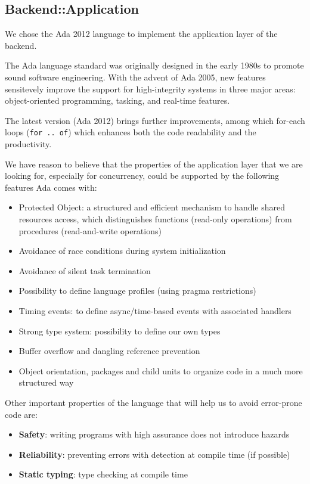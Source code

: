 \subsection{Backend::Application}
We chose the Ada 2012 language to implement the application layer of the
backend.

The Ada language standard was originally designed in the early 1980s to promote
sound software engineering. With the advent of Ada 2005, new features
sensitevely improve the support for high-integrity systems in three major
areas: object-oriented programming, tasking, and real-time features.

The latest version (Ada 2012) brings further improvements, among which for-each
loops (\texttt{for .. of}) which enhances both the code readability and the
productivity.

We have reason to believe that the properties of the application layer
that we are looking for, especially for concurrency, could be supported by the
following features Ada comes with:
\begin{itemize}
  \item Protected Object: a structured and efficient mechanism to handle
        shared resources access, which distinguishes functions (read-only
        operations) from procedures (read-and-write operations)
  \item Avoidance of race conditions during system initialization
  \item Avoidance of silent task termination
  \item Possibility to define language profiles (using pragma restrictions)
  \item Timing events: to define async/time-based events with associated
        handlers
  \item Strong type system: possibility to define our own types
  \item Buffer overflow and dangling reference prevention
  \item Object orientation, packages and child units to organize code in a much
        more structured way
\end{itemize}

Other important properties of the language that will help us to avoid
error-prone code are:
\begin{itemize}
  \item \textbf{Safety}: writing programs with high assurance does not
        introduce hazards
  \item \textbf{Reliability}: preventing errors with detection at compile time
        (if possible)
  \item \textbf{Static typing}: type checking at compile time
\end{itemize}

